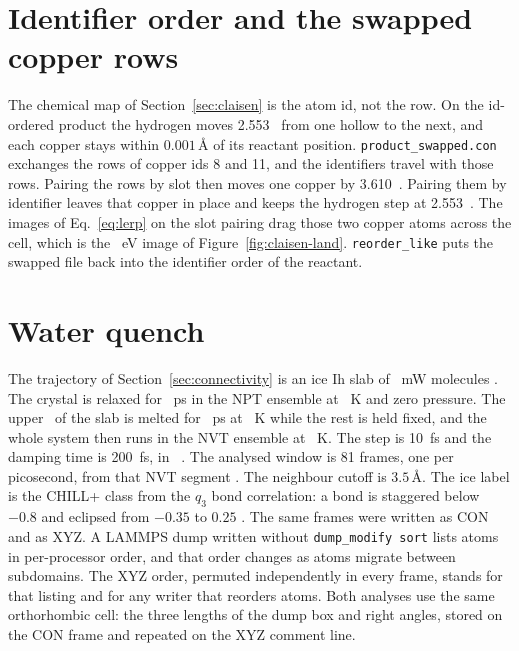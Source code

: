 \section{Identifier order and the swapped copper rows}\label{sec:supp-claisen-protocol}
The chemical map of Section~\ref{sec:claisen} is the atom id, not the row.
On the id-ordered product the hydrogen moves 2.553~\text{\AA} from one hollow to the next, and each copper stays within \(0.001\,\text{\AA}\) of its reactant position.
\texttt{product\_swapped.con} exchanges the rows of copper ids 8 and 11, and the identifiers travel with those rows.
Pairing the rows by slot then moves one copper by 3.610~\text{\AA}.
Pairing them by identifier leaves that copper in place and keeps the hydrogen step at 2.553~\text{\AA}.
The images of Eq.~\eqref{eq:lerp} on the slot pairing drag those two copper atoms across the cell, which is the \hopSwapped~eV image of Figure~\ref{fig:claisen-land}.
\texttt{reorder\_like} puts the swapped file back into the identifier order of the reactant.

\section{Water quench}\label{sec:supp-water-protocol}
The trajectory of Section~\ref{sec:connectivity} is an ice Ih slab of \mwMolecules\ mW molecules
\cite{molineroWaterModeledIntermediate2009}.
The crystal is relaxed for \mwRelaxPs~ps in the NPT ensemble at \mwRelaxK~K and zero pressure.
The upper \mwMeltFrac\ of the slab is melted for \mwMeltPs~ps at \mwMeltK~K while the rest is held fixed, and the whole system then runs in the NVT ensemble at \mwHoldK~K.
The step is 10~fs and the damping time is 200~fs, in \mwLammps\
\cite{thompsonLammpsFlexibleSimulation2022}.
The analysed window is 81 frames, one per picosecond, from that NVT segment
\cite{nguyenIdentificationClathrateHydrates2015}.
The neighbour cutoff is \(3.5\,\text{\AA}\).
The ice label is the CHILL+ class from the \(q_3\) bond correlation: a bond is staggered below \(-0.8\) and eclipsed from \(-0.35\) to \(0.25\)
\cite{goswamiDseamsDeferredStructural2020}.
The same frames were written as CON and as XYZ.
A LAMMPS dump written without \texttt{dump\_modify sort} lists atoms in per-processor order, and that order changes as atoms migrate between subdomains.
The XYZ order, permuted independently in every frame, stands for that listing and for any writer that reorders atoms.
Both analyses use the same orthorhombic cell: the three lengths of the dump box and right angles, stored on the CON frame and repeated on the XYZ comment line.

